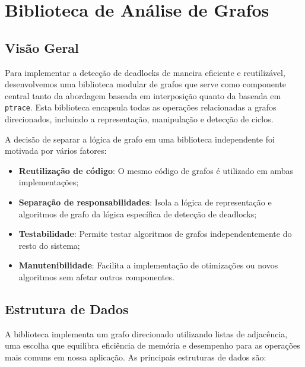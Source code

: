 \section{Biblioteca de Análise de Grafos}\label{sec:graph_library}

\subsection{Visão Geral}

Para implementar a detecção de deadlocks de maneira eficiente e reutilizável, desenvolvemos uma biblioteca modular de grafos que serve como componente central tanto da abordagem baseada em interposição quanto da baseada em \texttt{ptrace}. Esta biblioteca encapsula todas as operações relacionadas a grafos direcionados, incluindo a representação, manipulação e detecção de ciclos.

A decisão de separar a lógica de grafo em uma biblioteca independente foi motivada por vários fatores:

\begin{itemize}
    \item \textbf{Reutilização de código}: O mesmo código de grafos é utilizado em ambas implementações;
    \item \textbf{Separação de responsabilidades}: Isola a lógica de representação e algoritmos de grafo da lógica específica de detecção de deadlocks;
    \item \textbf{Testabilidade}: Permite testar algoritmos de grafos independentemente do resto do sistema;
    \item \textbf{Manutenibilidade}: Facilita a implementação de otimizações ou novos algoritmos sem afetar outros componentes.
\end{itemize}

\subsection{Estrutura de Dados}

A biblioteca implementa um grafo direcionado utilizando listas de adjacência, uma escolha que equilibra eficiência de memória e desempenho para as operações mais comuns em nossa aplicação. As principais estruturas de dados são:

